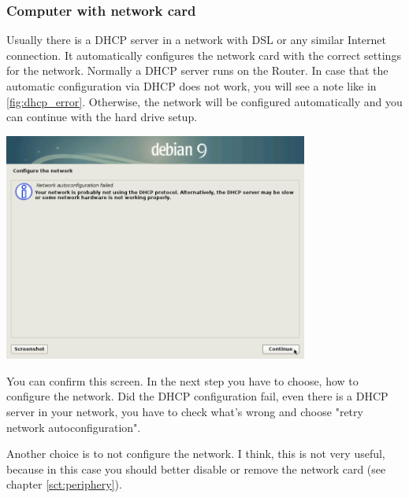 \documentclass[a4paper,12pt,twoside]{article}
\begin{document}
\subsubsection{Computer with network card}
\label{sct:inst_with_net}
Usually there is a DHCP server in a network with DSL or any similar
Internet connection. It automatically configures the network card with
the correct settings for the network. Normally a DHCP server runs on
the Router. In case that the automatic configuration via DHCP does not
work, you will see a note like in \ref{fig:dhcp_error}. Otherwise, the
network will be configured automatically and you can continue with the
hard drive setup.

\bigskip
\begin{minipage}{\linewidth}
    \centering
    \captionsetup{type=figure}
    \includegraphics[width=10cm]{screenshots/message_dhcp_failed.png}
    \label{fig:dhcp_error}
\end{minipage}
\bigskip

You can confirm this screen. In the next step you have to choose, how to
configure the network. Did the DHCP configuration fail, even there is a
DHCP server in your network, you have to check what's
wrong and choose "retry network autoconfiguration".

Another choice is to not configure the network. I think, this is not
very useful, because in this case you should better disable or remove
the network card (see chapter \ref{sct:periphery}).
\end{document}
